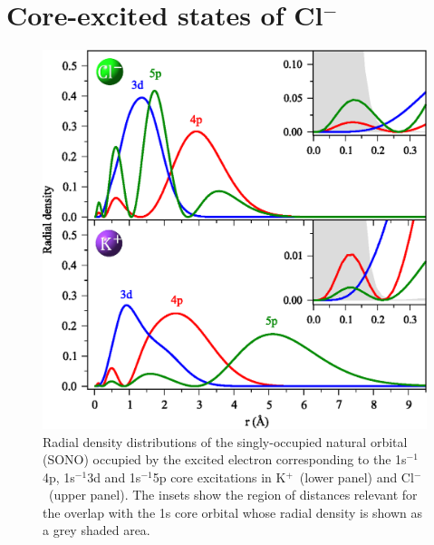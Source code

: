 \documentclass[journal=jpclcd,manuscript=letter]{achemso}
\newcommand{\cli}{Cl$^{-}$}
\newcommand{\ki}{K$^{+}$}
\begin{document}
\section{Core-excited states of Cl$^{-}$}
\begin{figure}[h!]
\centering
\includegraphics[scale=0.8]{figures/rad_dens_kcl.eps}
\caption{Radial density distributions of the singly-occupied natural orbital (SONO) occupied by the excited electron corresponding to the 1s$^{-1}$4p, 1s$^{-1}$3d and 1s$^{-1}$5p core excitations in \ki~(lower panel) and \cli~(upper panel). The insets show the region of distances relevant for the overlap with the 1s core orbital whose radial density is shown as a grey shaded area.}
\label{fg:si_rdens_ions}
\end{figure}
\end{document}
